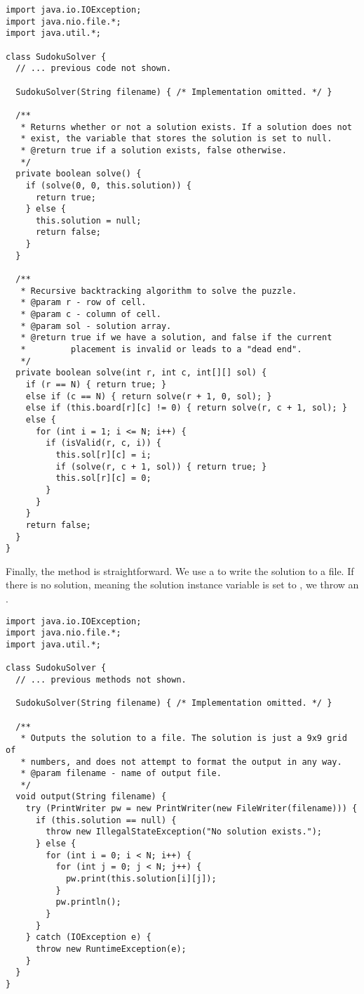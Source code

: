 \begin{lstlisting}[language=MyJava]
import java.io.IOException;
import java.nio.file.*;
import java.util.*;

class SudokuSolver {
  // ... previous code not shown.

  SudokuSolver(String filename) { /* Implementation omitted. */ }

  /**
   * Returns whether or not a solution exists. If a solution does not 
   * exist, the variable that stores the solution is set to null.
   * @return true if a solution exists, false otherwise.
   */
  private boolean solve() {
    if (solve(0, 0, this.solution)) { 
      return true; 
    } else { 
      this.solution = null; 
      return false;
    }
  }

  /**
   * Recursive backtracking algorithm to solve the puzzle. 
   * @param r - row of cell.
   * @param c - column of cell.
   * @param sol - solution array.
   * @return true if we have a solution, and false if the current
   *         placement is invalid or leads to a "dead end".
   */ 
  private boolean solve(int r, int c, int[][] sol) {
    if (r == N) { return true; }
    else if (c == N) { return solve(r + 1, 0, sol); }
    else if (this.board[r][c] != 0) { return solve(r, c + 1, sol); }
    else {
      for (int i = 1; i <= N; i++) {
        if (isValid(r, c, i)) {
          this.sol[r][c] = i;
          if (solve(r, c + 1, sol)) { return true; }
          this.sol[r][c] = 0;
        }
      }
    }
    return false;
  }
}
\end{lstlisting}

Finally, the  method is straightforward. We use a  to write the solution to a file. If there is no solution, meaning the solution instance variable is set to , we throw an .

\begin{lstlisting}[language=MyJava]
import java.io.IOException;
import java.nio.file.*;
import java.util.*;

class SudokuSolver {
  // ... previous methods not shown.

  SudokuSolver(String filename) { /* Implementation omitted. */ }

  /**
   * Outputs the solution to a file. The solution is just a 9x9 grid of 
   * numbers, and does not attempt to format the output in any way.
   * @param filename - name of output file.
   */
  void output(String filename) {
    try (PrintWriter pw = new PrintWriter(new FileWriter(filename))) {
      if (this.solution == null) { 
        throw new IllegalStateException("No solution exists."); 
      } else {
        for (int i = 0; i < N; i++) {
          for (int j = 0; j < N; j++) {
            pw.print(this.solution[i][j]);
          }
          pw.println();
        }
      }
    } catch (IOException e) {
      throw new RuntimeException(e);
    }
  }
}
\end{lstlisting}

